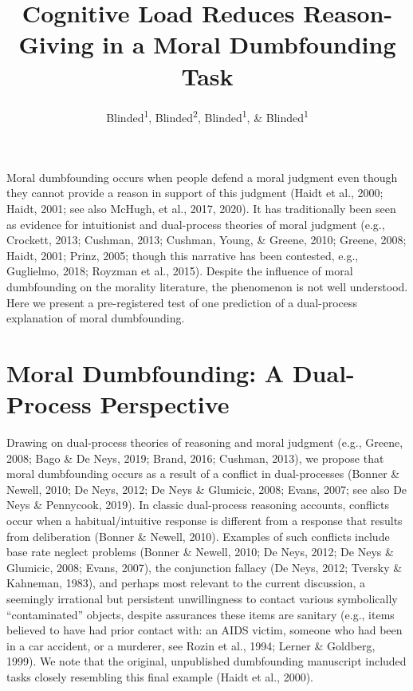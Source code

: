 \documentclass[
  american,
  man,floatsintext]{apa7}
\title{Cognitive Load Reduces Reason-Giving in a Moral Dumbfounding Task}
\author{Blinded\textsuperscript{1}, Blinded\textsuperscript{2}, Blinded\textsuperscript{1}, \& Blinded\textsuperscript{1}}
\date{}
\affiliation{\vspace{0.5cm}\textsuperscript{1} Blinded\\\textsuperscript{2} Blinded}
\begin{document}
\maketitle

Moral dumbfounding occurs when people defend a moral judgment even though they cannot provide a reason in support of this judgment (Haidt et al., 2000; Haidt, 2001; see also McHugh, et al., 2017, 2020). It has traditionally been seen as evidence for intuitionist and dual-process theories of moral judgment (e.g., Crockett, 2013; Cushman, 2013; Cushman, Young, \& Greene, 2010; Greene, 2008; Haidt, 2001; Prinz, 2005; though this narrative has been contested, e.g., Guglielmo, 2018; Royzman et al., 2015). Despite the influence of moral dumbfounding on the morality literature, the phenomenon is not well understood. Here we present a pre-registered test of one prediction of a dual-process explanation of moral dumbfounding.

\hypertarget{moral-dumbfounding-a-dual-process-perspective}{%
\section{Moral Dumbfounding: A Dual-Process Perspective}\label{moral-dumbfounding-a-dual-process-perspective}}

Drawing on dual-process theories of reasoning and moral judgment (e.g., Greene, 2008; Bago \& De Neys, 2019; Brand, 2016; Cushman, 2013), we propose that moral dumbfounding occurs as a result of a conflict in dual-processes (Bonner \& Newell, 2010; De Neys, 2012; De Neys \& Glumicic, 2008; Evans, 2007; see also De Neys \& Pennycook, 2019). In classic dual-process reasoning accounts, conflicts occur when a habitual/intuitive response is different from a response that results from deliberation (Bonner \& Newell, 2010). Examples of such conflicts include base rate neglect problems (Bonner \& Newell, 2010; De Neys, 2012; De Neys \& Glumicic, 2008; Evans, 2007), the conjunction fallacy (De Neys, 2012; Tversky \& Kahneman, 1983), and perhaps most relevant to the current discussion, a seemingly irrational but persistent unwillingness to contact various symbolically \enquote{contaminated} objects, despite assurances these items are sanitary (e.g., items believed to have had prior contact with: an AIDS victim, someone who had been in a car accident, or a murderer, see Rozin et al., 1994; Lerner \& Goldberg, 1999). We note that the original, unpublished dumbfounding manuscript included tasks closely resembling this final example (Haidt et al., 2000).
\end{document}
